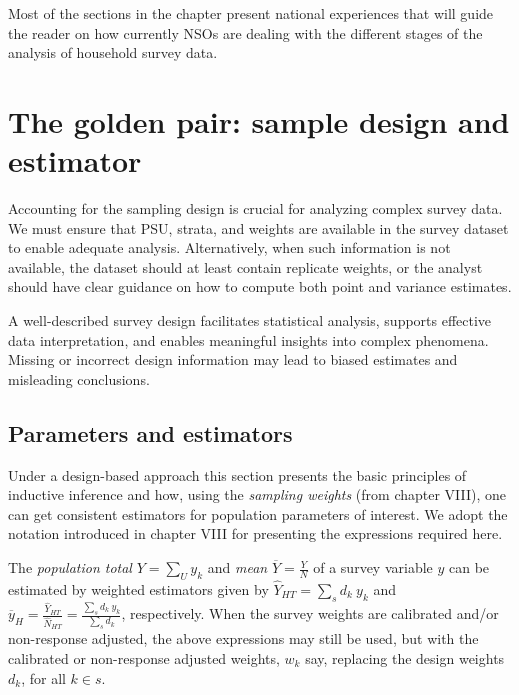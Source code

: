 \documentclass[
  12pt,
]{book}
\begin{document}
Most of the sections in the chapter present national experiences that will guide the reader on how currently NSOs are dealing with the different stages of the analysis of household survey data.

\hypertarget{the-golden-pair-sample-design-and-estimator}{%
\chapter{The golden pair: sample design and estimator}\label{the-golden-pair-sample-design-and-estimator}}

Accounting for the sampling design is crucial for analyzing complex survey data. We must ensure that PSU, strata, and weights are available in the survey dataset to enable adequate analysis. Alternatively, when such information is not available, the dataset should at least contain replicate weights, or the analyst should have clear guidance on how to compute both point and variance estimates.

A well-described survey design facilitates statistical analysis, supports effective data interpretation, and enables meaningful insights into complex phenomena. Missing or incorrect design information may lead to biased estimates and misleading conclusions.

\hypertarget{parameters-and-estimators}{%
\section{Parameters and estimators}\label{parameters-and-estimators}}

Under a design-based approach this section presents the basic principles of inductive inference and how, using the \emph{sampling weights} (from chapter VIII), one can get consistent estimators for population parameters of interest. We adopt the notation introduced in chapter VIII for presenting the expressions required here.

The \emph{population total} \(Y = \sum _{U} y_k\) and \emph{mean} \(\overline Y = \frac Y N\) of a survey variable \(y\) can be estimated by weighted estimators given by \(\widehat Y _{HT} = \sum _{s} d_k \ y_k\) and \(\overline y_{H} = \frac {\widehat Y_{HT}} {\widehat N_{HT}} = \frac {\sum_{s} d_k \ y_k} {\sum_{s} d_k}\), respectively. When the survey weights are calibrated and/or non-response adjusted, the above expressions may still be used, but with the calibrated or non-response adjusted weights, \(w_k\) say, replacing the design weights \(d_k\), for all \(k \in s\).
\end{document}
